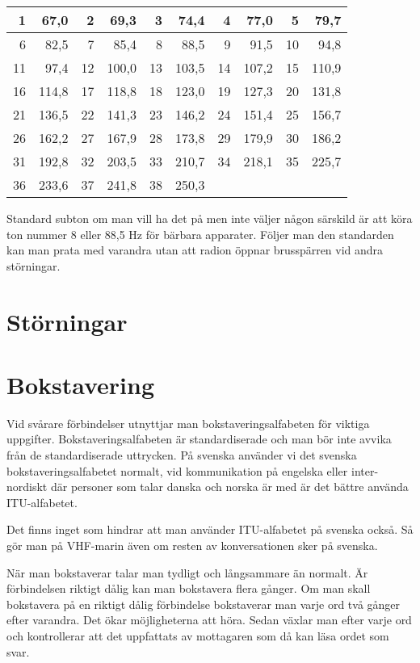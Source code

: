 \begin{tabular}{rr|rr|rr|rr|rr}
	 1 &  67,0 &  2 &  69,3 &  3 &  74,4 &  4 &  77,0 &  5 &  79,7 \\ \hline
	 6 &  82,5 &  7 &  85,4 &  8 &  88,5 &  9 &  91,5 & 10 &  94,8 \\ \hline
	11 &  97,4 & 12 & 100,0 & 13 & 103,5 & 14 & 107,2 & 15 & 110,9 \\ \hline
	16 & 114,8 & 17 & 118,8 & 18 & 123,0 & 19 & 127,3 & 20 & 131,8 \\ \hline
	21 & 136,5 & 22 & 141,3 & 23 & 146,2 & 24 & 151,4 & 25 & 156,7 \\ \hline
	26 & 162,2 & 27 & 167,9 & 28 & 173,8 & 29 & 179,9 & 30 & 186,2 \\ \hline
	31 & 192,8 & 32 & 203,5 & 33 & 210,7 & 34 & 218,1 & 35 & 225,7 \\ \hline
	36 & 233,6 & 37 & 241,8 & 38 & 250,3 &    &       &    &
\end{tabular}

Standard subton om man vill ha det på men inte väljer någon särskild är att köra ton nummer 8 eller 88,5 Hz för bärbara apparater. Följer man den standarden kan man prata med varandra utan att radion öppnar brusspärren vid andra störningar.

\section{Störningar}

\section{Bokstavering}

Vid svårare förbindelser utnyttjar man bokstaveringsalfabeten för viktiga uppgifter. Bokstaveringsalfabeten är standardiserade och man bör inte avvika från de standardiserade uttrycken. På svenska använder vi det svenska bokstaveringsalfabetet normalt, vid kommunikation på engelska eller inter-nordiskt där personer som talar danska och norska är med är det bättre använda ITU-alfabetet.

Det finns inget som hindrar att man använder ITU-alfabetet på svenska också. Så gör man på VHF-marin även om resten av konversationen sker på svenska.

När man bokstaverar talar man tydligt och långsammare än normalt. Är förbindelsen riktigt dålig kan man bokstavera flera gånger. Om man skall bokstavera på en riktigt dålig förbindelse bokstaverar man varje ord två gånger efter varandra. Det ökar möjligheterna att höra. Sedan växlar man efter varje ord och kontrollerar att det uppfattats av mottagaren som då kan läsa ordet som svar.

